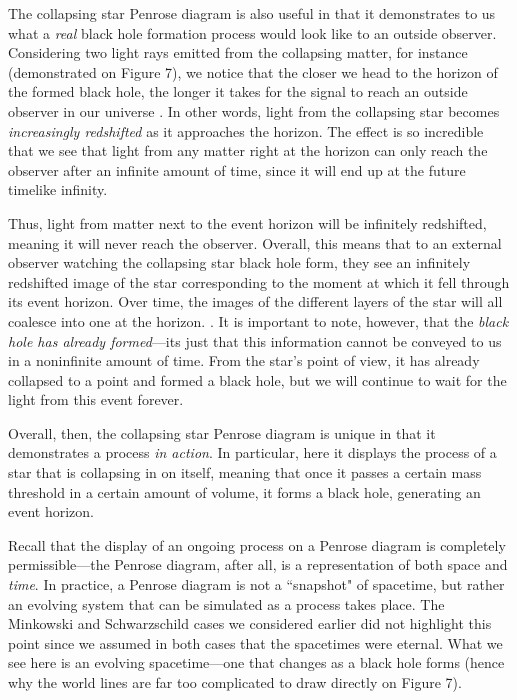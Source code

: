\documentclass{article}
\begin{document}
The collapsing star Penrose diagram is also useful in that it demonstrates to us what a \textit{real} black hole formation process would look like to an outside observer. Considering two light rays emitted from the collapsing matter, for instance (demonstrated on Figure 7), we notice that the closer we head to the horizon of the formed black hole, the longer it takes for the signal to reach an outside observer in our universe \cite{2022Penrose}. In other words, light from the collapsing star becomes \textit{increasingly redshifted} as it approaches the horizon. The effect is so incredible that we see that light from any matter right at the horizon can only reach the observer after an infinite amount of time, since it will end up at the future timelike infinity. 

Thus, light from matter next to the event horizon will be infinitely redshifted, meaning it will never reach the observer. Overall, this means that to an external observer watching the collapsing star black hole form, they see an infinitely redshifted image of the star corresponding to the moment at which it fell through its event horizon. Over time, the images of the different layers of the star will all coalesce into one at the horizon. \cite{collapse_colorado}. It is important to note, however, that the \textit{black hole has already formed}---its just that this information cannot be conveyed to us in a noninfinite amount of time. From the star's point of view, it has already collapsed to a point and formed a black hole, but we will continue to wait for the light from this event forever.

Overall, then, the collapsing star Penrose diagram is unique in that it demonstrates a process \textit{in action}. In particular, here it displays the process of a star that is collapsing in on itself, meaning that once it passes a certain mass threshold in a certain amount of volume, it forms a black hole, generating an event horizon. 

Recall that the display of an ongoing process on a Penrose diagram is completely permissible---the Penrose diagram, after all, is a representation of both space and \textit{time}. In practice, a Penrose diagram is not a ``snapshot" of spacetime, but rather an evolving system that can be simulated as a process takes place. The Minkowski and Schwarzschild cases we considered earlier did not highlight this point since we assumed in both cases that the spacetimes were eternal. What we see here is an evolving spacetime---one that changes as a black hole forms (hence why the world lines are far too complicated to draw directly on Figure 7).
\end{document}
